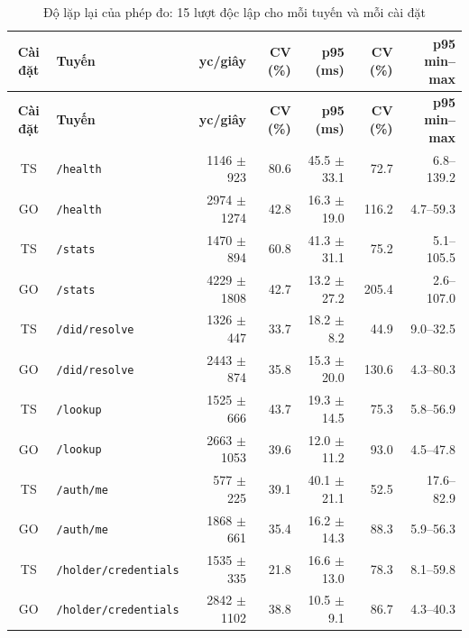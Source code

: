 \begingroup
\footnotesize
\setlength{\tabcolsep}{4pt}
\begin{longtable}{|c|l|r|r|r|r|r|}
\caption{Độ lặp lại của phép đo: 15 lượt độc lập cho mỗi tuyến và mỗi cài đặt}
\label{tab:bench-repeat} \\

\hline
\textbf{Cài đặt} & \textbf{Tuyến} & \textbf{yc/giây} & \textbf{CV (\%)} & \textbf{p95 (ms)} & \textbf{CV (\%)} & \textbf{p95 min--max} \\
\hline
\endfirsthead

\hline
\textbf{Cài đặt} & \textbf{Tuyến} & \textbf{yc/giây} & \textbf{CV (\%)} & \textbf{p95 (ms)} & \textbf{CV (\%)} & \textbf{p95 min--max} \\
\hline
\endhead

\hline
\endfoot

\hline
\endlastfoot

TS & \texttt{/health} & 1146 $\pm$ 923 & 80.6 & 45.5 $\pm$ 33.1 & 72.7 & 6.8--139.2 \\
GO & \texttt{/health} & 2974 $\pm$ 1274 & 42.8 & 16.3 $\pm$ 19.0 & 116.2 & 4.7--59.3 \\
TS & \texttt{/stats} & 1470 $\pm$ 894 & 60.8 & 41.3 $\pm$ 31.1 & 75.2 & 5.1--105.5 \\
GO & \texttt{/stats} & 4229 $\pm$ 1808 & 42.7 & 13.2 $\pm$ 27.2 & 205.4 & 2.6--107.0 \\
TS & \texttt{/did/resolve} & 1326 $\pm$ 447 & 33.7 & 18.2 $\pm$ 8.2 & 44.9 & 9.0--32.5 \\
GO & \texttt{/did/resolve} & 2443 $\pm$ 874 & 35.8 & 15.3 $\pm$ 20.0 & 130.6 & 4.3--80.3 \\
TS & \texttt{/lookup} & 1525 $\pm$ 666 & 43.7 & 19.3 $\pm$ 14.5 & 75.3 & 5.8--56.9 \\
GO & \texttt{/lookup} & 2663 $\pm$ 1053 & 39.6 & 12.0 $\pm$ 11.2 & 93.0 & 4.5--47.8 \\
TS & \texttt{/auth/me} & 577 $\pm$ 225 & 39.1 & 40.1 $\pm$ 21.1 & 52.5 & 17.6--82.9 \\
GO & \texttt{/auth/me} & 1868 $\pm$ 661 & 35.4 & 16.2 $\pm$ 14.3 & 88.3 & 5.9--56.3 \\
TS & \texttt{/holder/credentials} & 1535 $\pm$ 335 & 21.8 & 16.6 $\pm$ 13.0 & 78.3 & 8.1--59.8 \\
GO & \texttt{/holder/credentials} & 2842 $\pm$ 1102 & 38.8 & 10.5 $\pm$ 9.1 & 86.7 & 4.3--40.3 \\

\end{longtable}
\endgroup
